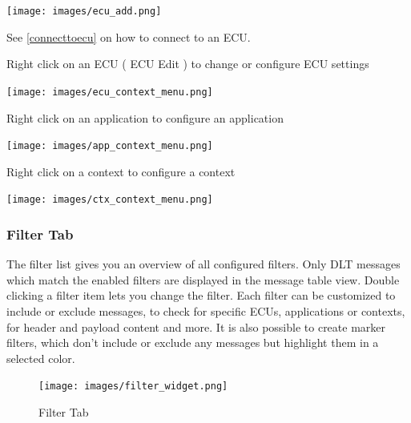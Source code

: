 \documentclass[a4paper,11pt]{article}
\begin{document}
\vspace{0.1cm}

\texttt{[image: images/ecu\_add.png]}\linebreak

\vspace{0.1cm} See \autoref{connecttoecu} on how to connect to an ECU.\linebreak

\vspace{0.3cm}

Right click on an ECU ( ECU Edit ) to change or configure ECU settings\linebreak

\vspace{0.1cm}

\texttt{[image: images/ecu\_context\_menu.png]}

\vspace{0.1cm}

Right click on an application to configure an application

\vspace{0.1cm}

\texttt{[image: images/app\_context\_menu.png]}

\vspace{0.1cm}

Right click on a context to configure a context\linebreak

\vspace{0.1cm}

\texttt{[image: images/ctx\_context\_menu.png]}

\vspace{0.1cm}


\subsubsection{Filter Tab}
The filter list gives you an overview of all configured filters. Only DLT messages which match the enabled filters are displayed in the message table view.
Double clicking a filter item lets you change the filter. Each filter can be customized to include or exclude messages, to check for
specific ECUs, applications or contexts, for header and payload content and more. It is also possible to create marker filters, which don't
include or exclude any messages but highlight them in a selected color.


\begin{figure}[H]
 \centering
 \texttt{[image: images/filter\_widget.png]}
 \caption{Filter Tab}
 \label{fig:filtertab}
\end{figure}
\end{document}
